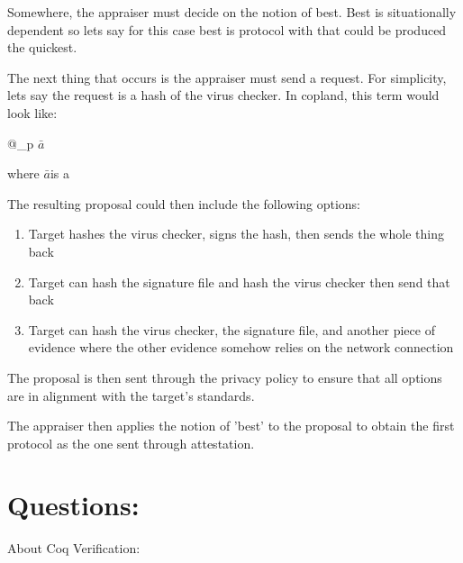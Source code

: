 \documentclass[10pt]{report}
\newcommand{\bara}[0]{$\mathit{\bar{a}}$}
\begin{document}
Somewhere, the appraiser must decide on the notion of best. Best is
situationally dependent so lets say for this case best is protocol
with that could be produced the quickest. 

The next thing that occurs is the appraiser must send a request.
For simplicity, lets say the request is a hash of the virus checker. In
copland, this term would look like:

@_{p} \bara

where \bara  is a 

The resulting proposal could then include the following options:

\begin{enumerate}
\item Target hashes the virus checker, signs the hash, then sends the
  whole thing back
\item Target can hash the signature file and hash the virus checker
  then send that back
\item Target can hash the virus checker, the signature file, and another
  piece of evidence where the other evidence somehow relies on the network
  connection
\end{enumerate}

The proposal is then sent through the privacy policy to ensure that
all options are in alignment with the target's standards. 

The appraiser then applies the notion of 'best' to the proposal to obtain
the first protocol as the one sent through attestation.

\chapter{Questions:}

About Coq Verification:
\end{document}
